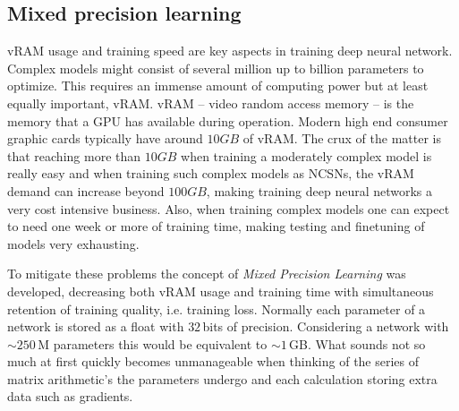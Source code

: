 \subsection{Mixed precision learning} \label{sec:5.3.1}
vRAM usage and training speed are key aspects in training deep neural network. Complex models might consist of several million up to billion parameters to optimize. This requires an immense amount of computing power but at least equally important, vRAM. vRAM – video random access memory – is the memory that a GPU has available during operation. Modern high end consumer graphic cards typically have around $10GB$ of vRAM. The crux of the matter is that reaching more than $10GB$ when training a moderately complex model is really easy and when training such complex models as NCSNs, the vRAM demand can increase beyond $100GB$, making training deep neural networks a very cost intensive business. Also, when training complex models one can expect to need one week or more of training time, making testing and finetuning of models very exhausting.

To mitigate these problems the concept of \textit{Mixed Precision Learning} \cite{mixed_prec} was developed, decreasing both vRAM usage and training time with simultaneous retention of training quality, i.e. training loss. Normally each parameter of a network is stored as a float with $32$\,bits of precision. Considering a network with $\sim250$\,M parameters this would be equivalent to $\sim1$\,GB. What sounds not so much at first quickly becomes unmanageable when thinking of the series of matrix arithmetic's the parameters undergo and each calculation storing extra data such as gradients. 

